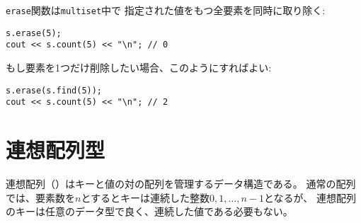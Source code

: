 \texttt{erase}関数は\texttt{multiset}中で
指定された値をもつ全要素を同時に取り除く:

\begin{lstlisting}
s.erase(5);
cout << s.count(5) << "\n"; // 0
\end{lstlisting}

\begin{comment}
Often, only one instance should be removed,
which can be done as follows:
\end{comment}

もし要素を1つだけ削除したい場合、このようにすればよい:
\begin{lstlisting}
s.erase(s.find(5));
cout << s.count(5) << "\n"; // 2
\end{lstlisting}

\begin{comment}
\section{Map structures}

\index{map}

A \key{map} is a generalized array
that consists of key-value-pairs.
While the keys in an ordinary array are always
the consecutive integers $0,1,\ldots,n-1$,
where $n$ is the size of the array,
the keys in a map can be of any data type and
they do not have to be consecutive values.
\end{comment}

\section{連想配列型}


連想配列（）はキーと値の対の配列を管理するデータ構造である。
通常の配列では、要素数を$n$とするとキーは連続した整数$0,1,\ldots,n-1$となるが、
連想配列のキーは任意のデータ型で良く、連続した値である必要もない。

\begin{comment}
The C++ standard library contains two map
implementations that correspond to the set
implementations: the structure
\texttt{map} is based on a balanced
binary tree and accessing elements
takes $O(\log n)$ time,
while the structure
\texttt{unordered\_map} uses hashing
and accessing elements takes $O(1)$ time on average.

The following code creates a map
where the keys are strings and the values are integers:
\end{comment}

